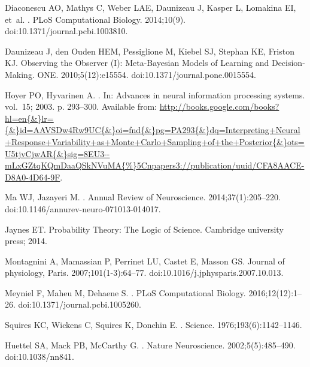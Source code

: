 \documentclass[10pt,letterpaper]{article}
\begin{document}
\begin{thebibliography}{10}
Diaconescu AO, Mathys C, Weber LAE, Daunizeau J, Kasper L, Lomakina EI, et~al.
.
\newblock PLoS Computational Biology. 2014;10(9).
\newblock doi:{10.1371/journal.pcbi.1003810}.

Daunizeau J, den Ouden HEM, Pessiglione M, Kiebel SJ, Stephan KE, Friston KJ.
\newblock Observing the Observer (I): Meta-Bayesian Models of Learning and
  Decision-Making.
 {ONE}. 2010;5(12):e15554.
\newblock doi:{10.1371/journal.pone.0015554}.

Hoyer PO, Hyvarinen A.
.
\newblock In: Advances in neural information processing systems. vol.~15; 2003.
  p. 293--300.
\newblock Available from:
  \url{http://books.google.com/books?hl=en{\&}lr={\&}id=AAVSDw4Rw9UC{\&}oi=fnd{\&}pg=PA293{\&}dq=Interpreting+Neural+Response+Variability+as+Monte+Carlo+Sampling+of+the+Posterior{\&}ots=U5tjvCjwAR{\&}sig=8EU3--mLxGZtqKQmDaaQSkNVuMA{\%}5Cnpapers3://publication/uuid/CFA8AACE-D8A0-4D64-9F}.

Ma WJ, Jazayeri M.
.
\newblock Annual Review of Neuroscience. 2014;37(1):205--220.
\newblock doi:{10.1146/annurev-neuro-071013-014017}.

Jaynes ET.
\newblock Probability Theory: The Logic of Science.
\newblock Cambridge university press; 2014.

Montagnini A, Mamassian P, Perrinet LU, Castet E, Masson GS.
\newblock Journal of physiology, Paris. 2007;101(1-3):64--77.
\newblock doi:{10.1016/j.jphysparis.2007.10.013}.

Meyniel F, Maheu M, Dehaene S.
.
\newblock PLoS Computational Biology. 2016;12(12):1--26.
\newblock doi:{10.1371/journal.pcbi.1005260}.

Squires KC, Wickens C, Squires K, Donchin E.
.
\newblock Science. 1976;193(6):1142--1146.

Huettel SA, Mack PB, McCarthy G.
.
\newblock Nature Neuroscience. 2002;5(5):485--490.
\newblock doi:{10.1038/nn841}.


\end{thebibliography}
\end{document}
